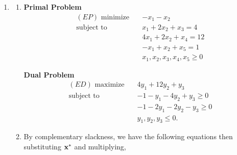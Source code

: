 \begin{enumerate}
\begin{enumerate}
\begin{minipage}[t]{0.45\textwidth}
\begin{align*}
                                                    & -2 - y_1 + y_2 = 0     \\
                                                    & y_1 \leq 0, y_2 \geq 0
                        \end{align*}
                    \end{minipage}
          \end{enumerate}
    \item \begin{enumerate}[label=\roman*)]
              \item        \begin{minipage}[t]{0.45\textwidth}
                        \textbf{Primal Problem}
                        \begin{align*}
                            (EP) \text{ minimize} \quad & -x_1 -x_2                      \\
                            \text{subject to} \quad     & x_1 + 2x_2 + x_3 = 4           \\
                                                        & 4x_1 + 2x_2 + x_4 = 12         \\
                                                        & -x_1 + x_2 + x_5 = 1           \\
                                                        & x_1, x_2, x_3, x_4, x_5 \geq 0
                        \end{align*}
                    \end{minipage}
                    \hfill
                    \begin{minipage}[t]{0.45\textwidth}
                        \textbf{Dual Problem}
                        \begin{align*}
                            (ED) \text{ maximize} \quad & 4y_1 + 12y_2 + y_3            \\
                            \text{subject to} \quad     & -1 - y_1 - 4y_2 + y_3 \geq 0  \\
                                                        & -1 - 2y_1 - 2y_2 - y_3 \geq 0 \\
                                                        & y_1, y_2, y_3 \leq 0.
                        \end{align*}
                    \end{minipage}
              \item By complementary slackness, we have the following equations then substituting \(\mathbf{x}^*\) and multiplying,

\end{enumerate}
\end{enumerate}
